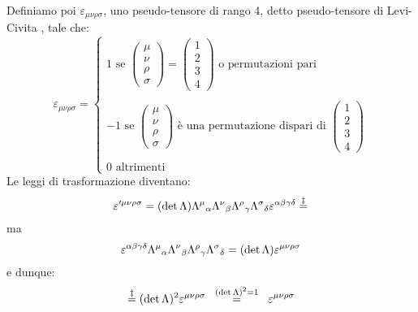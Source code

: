 \begin{definizione}
Definiamo poi $\varepsilon_{\mu\nu\rho\sigma}$, uno pseudo-tensore di
rango 4, detto pseudo-tensore di Levi-Civita , tale che: 
\begin{equation}
 \varepsilon_{\mu\nu\rho\sigma} 
  = \left\{
     \begin{array}{l}
      1 \mbox{ se } \left(
		     \begin{array}{c}
		     \mu\\\nu\\\rho\\\sigma
		     \end{array}
		    \right)=
      \left(
       \begin{array}{c}
       1\\2\\3\\4
       \end{array}
      \right) 
      \mbox{ o permutazioni pari}\\ 
      \mbox{ }\\ 
      -1 \mbox{ se } 
       \left(
	\begin{array}{c}
	\mu\\\nu\\\rho\\\sigma
	\end{array}
       \right) 
       \mbox{ \`e una permutazione dispari di } 
	     \left(
	      \begin{array}{c} 
	      1\\2\\3\\4
	      \end{array}
	     \right)\\
      \mbox{}\\ 0 \mbox{ altrimenti}
     \end{array} 
    \right.
\end{equation}
Le leggi di trasformazione diventano:
\begin{equation}
 \varepsilon'^{\mu\nu\rho\sigma} = (\det \Lambda) \Lambda^{\mu}{}_{\alpha} 
  \Lambda^{\nu}{}_{\beta} 
  \Lambda^{\rho}{}_{\gamma} 
  \Lambda^{\sigma}{}_{\delta} 
  \varepsilon^{\alpha\beta\gamma\delta}
  \stackrel{\ddagger}{=}
\end{equation}
ma
\begin{equation}
 \varepsilon^{\alpha\beta\gamma\delta} 
 \Lambda^{\mu}{}_{\alpha} 
 \Lambda^{\nu}{}_{\beta} 
 \Lambda^{\rho}{}_{\gamma}
 \Lambda^{\sigma}{}_{\delta} = 
 (\det\Lambda)\varepsilon^{\mu\nu\rho\sigma}
 \end{equation}
e dunque:
\begin{equation}
 \stackrel{\ddagger}{=}
  (\det\Lambda)^2 
  \varepsilon^{\mu\nu\rho\sigma}   \; \; 
  \stackrel{\tiny(\det\Lambda)^2=1}{=} \; \;
  \varepsilon^{\mu\nu\rho\sigma}
\end{equation}
\end{definizione}
